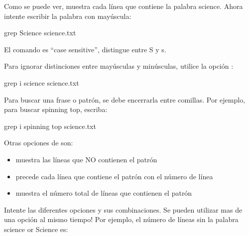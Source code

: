 \documentclass[letterpaper,10pt,english]{jupyterBook}
\begin{document}
\sphinxAtStartPar
Como se puede ver,  muestra cada línea que contiene la palabra science.
Ahora intente escribir la palabra con mayúscula:

\begin{sphinxVerbatim}[commandchars=\\\{\}]
\PYGZdl{} grep Science science.txt
\end{sphinxVerbatim}

\sphinxAtStartPar
El comando  es “case sensitive”, distingue entre S y s.

\sphinxAtStartPar
Para ignorar distinciones entre mayúsculas y minúsculas, utilice la opción :

\begin{sphinxVerbatim}[commandchars=\\\{\}]
\PYGZdl{} grep \PYGZhy{}i science science.txt
\end{sphinxVerbatim}

\sphinxAtStartPar
Para buscar una frase o patrón, se debe encerrarla entre comillas. Por ejemplo, para buscar spinning top, escriba:

\begin{sphinxVerbatim}[commandchars=\\\{\}]
\PYGZdl{} grep \PYGZhy{}i \PYGZsq{}spinning top\PYGZsq{} science.txt
\end{sphinxVerbatim}

\sphinxAtStartPar
Otras opciones de  son:
\begin{itemize}
\item {} 
\sphinxAtStartPar
{} muestra las líneas que NO contienen el patrón

\item {} 
\sphinxAtStartPar
{} precede cada línea que contiene el patrón con el número de línea

\item {} 
\sphinxAtStartPar
{} muestra el número total de líneas que contienen el patrón

\end{itemize}

\sphinxAtStartPar
Intente las diferentes opciones y sus combinaciones. Se pueden utilizar mas de una opción al mismo tiempo! Por ejemplo, el número de líneas sin la palabra science or Science es:
\end{document}
